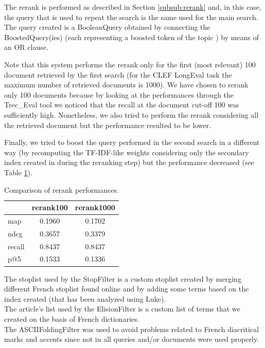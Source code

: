 \par
The rerank is performed as described in Section \ref{subsub:rerank} and, in this case, the query that is used to repeat the search is the same used for the main search. The query created is a BooleanQuery obtained by connecting the BoostedQuery(ies) (each representing a boosted token of the topic ) by means of an OR clause.
\par
Note that this system performs the rerank only for the first (most relevant) 100 document retrieved by the first search (for the CLEF LongEval task the maximum number of retrieved documents is 1000). We have chosen to rerank only 100 documents because by looking at the performances through the Trec\_Eval tool we noticed that the recall at the document cut-off 100 was sufficiently high. Nonetheless, we also tried to perform the rerank considering all the retrieved document but the performance resulted to be lower. 
\par
Finally, we tried to boost the query performed in the second search in a different way (by recomputing the TF-IDF-like weights considering only the secondary index created in during the reranking step) but the performance decreased (see Table \ref{tab:rerankperf}).

\begin{center}
\begin{table}[h!]
\centering
\begin{tabular}{|l|c|c|} 
 \hline
   & rerank100 & rerank1000  \\
 \hline\hline
 map & 0.1960 & 0.1702 \\ 
 ndcg & 0.3657 & 0.3379  \\
 recall & 0.8437 & 0.8437 \\
 p@5 & 0.1533 & 0.1336 \\ 
 \hline
\end{tabular}
\caption{Comparison of rerank performances.}
\label{tab:rerankperf}
\end{table}
\end{center}
\par
The stoplist used by the StopFilter is a custom stoplist created by merging different French stoplist found online and by adding some terms based on the index created (that has been analyzed using Luke).\\
The article’s list used by the ElisionFilter is a custom list of terms that we created on the basis of French dictionaries.\\
The ASCIIFoldingFilter was used to avoid problems related to French diacritical marks and accents since not in all queries and/or documents were used properly.

